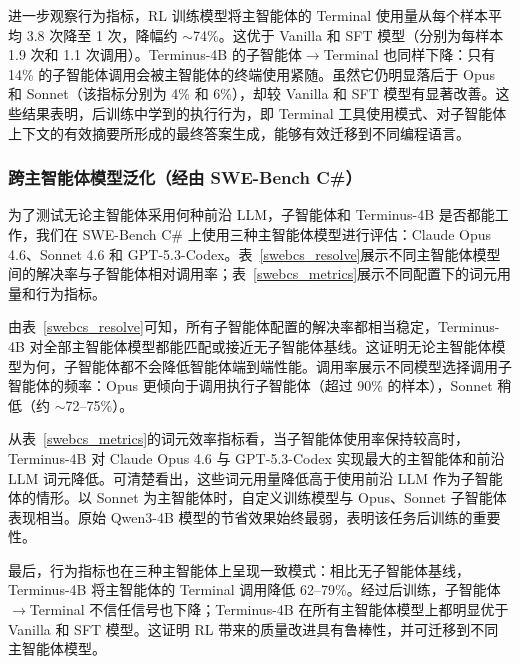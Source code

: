 \documentclass[sigconf,review]{acmart}
\begin{document}
进一步观察行为指标，RL 训练模型将主智能体的 Terminal 使用量从每个样本平均 3.8 次降至 1 次，降幅约 $\sim$74\%。这优于 Vanilla 和 SFT 模型（分别为每样本 1.9 次和 1.1 次调用）。Terminus-4B 的子智能体$\to$Terminal 也同样下降：只有 14\% 的子智能体调用会被主智能体的终端使用紧随。虽然它仍明显落后于 Opus 和 Sonnet（该指标分别为 4\% 和 6\%），却较 Vanilla 和 SFT 模型有显著改善。这些结果表明，后训练中学到的执行行为，即 Terminal 工具使用模式、对子智能体上下文的有效摘要所形成的最终答案生成，能够有效迁移到不同编程语言。

\subsubsection{跨主智能体模型泛化（经由 SWE-Bench C\#）}
为了测试无论主智能体采用何种前沿 LLM，子智能体和 Terminus-4B 是否都能工作，我们在 SWE-Bench C\# 上使用三种主智能体模型进行评估：Claude Opus 4.6、Sonnet 4.6 和 GPT-5.3-Codex。表~\ref{swebcs_resolve}展示不同主智能体模型间的解决率与子智能体相对调用率；表~\ref{swebcs_metrics}展示不同配置下的词元用量和行为指标。

由表~\ref{swebcs_resolve}可知，所有子智能体配置的解决率都相当稳定，Terminus-4B 对全部主智能体模型都能匹配或接近无子智能体基线。这证明无论主智能体模型为何，子智能体都不会降低智能体端到端性能。调用率展示不同模型选择调用子智能体的频率：Opus 更倾向于调用执行子智能体（超过 90\% 的样本），Sonnet 稍低（约 $\sim$72--75\%）。

从表~\ref{swebcs_metrics}的词元效率指标看，当子智能体使用率保持较高时，Terminus-4B 对 Claude Opus 4.6 与 GPT-5.3-Codex 实现最大的主智能体和前沿 LLM 词元降低。可清楚看出，这些词元用量降低高于使用前沿 LLM 作为子智能体的情形。以 Sonnet 为主智能体时，自定义训练模型与 Opus、Sonnet 子智能体表现相当。原始 Qwen3-4B 模型的节省效果始终最弱，表明该任务后训练的重要性。

最后，行为指标也在三种主智能体上呈现一致模式：相比无子智能体基线，Terminus-4B 将主智能体的 Terminal 调用降低 62--79\%。经过后训练，子智能体$\to$Terminal 不信任信号也下降；Terminus-4B 在所有主智能体模型上都明显优于 Vanilla 和 SFT 模型。这证明 RL 带来的质量改进具有鲁棒性，并可迁移到不同主智能体模型。
\end{document}
